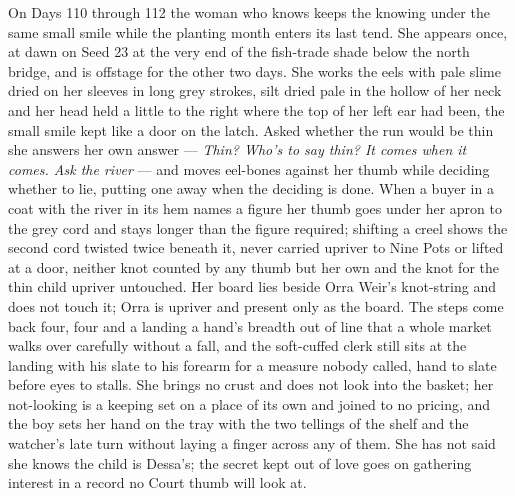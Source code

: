 \documentclass{design/chronicle}
\begin{document}
{On Days 110 through 112 the woman who knows keeps the knowing under the same small smile while the planting month enters its last tend. She appears once, at dawn on Seed 23 at the very end of the fish-trade shade below the north bridge, and is offstage for the other two days. She works the eels with pale slime dried on her sleeves in long grey strokes, silt dried pale in the hollow of her neck and her head held a little to the right where the top of her left ear had been, the small smile kept like a door on the latch. Asked whether the run would be thin she answers her own answer — \emph{Thin? Who’s to say thin? It comes when it comes. Ask the river} — and moves eel-bones against her thumb while deciding whether to lie, putting one away when the deciding is done. When a buyer in a coat with the river in its hem names a figure her thumb goes under her apron to the grey cord and stays longer than the figure required; shifting a creel shows the second cord twisted twice beneath it, never carried upriver to Nine Pots or lifted at a door, neither knot counted by any thumb but her own and the knot for the thin child upriver untouched. Her board lies beside Orra Weir’s knot-string and does not touch it; Orra is upriver and present only as the board. The steps come back four, four and a landing a hand’s breadth out of line that a whole market walks over carefully without a fall, and the soft-cuffed clerk still sits at the landing with his slate to his forearm for a measure nobody called, hand to slate before eyes to stalls. She brings no crust and does not look into the basket; her not-looking is a keeping set on a place of its own and joined to no pricing, and the boy sets her hand on the tray with the two tellings of the shelf and the watcher’s late turn without laying a finger across any of them. She has not said she knows the child is Dessa’s; the secret kept out of love goes on gathering interest in a record no Court thumb will look at.

}
\end{document}
